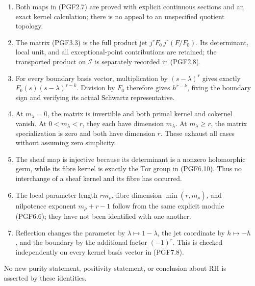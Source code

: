 \begin{enumerate}
\def\labelenumi{\arabic{enumi}.}
\tightlist
\item
  Both maps in (PGF2.7) are proved with explicit continuous sections and
  an exact kernel calculation; there is no appeal to an unspecified
  quotient topology.
\item
  The matrix (PGF3.3) is the full product jet \(j^rF_0\,j^r(F/F_0)\).
  Its determinant, local unit, and all exceptional-point contributions
  are retained; the transported product on \(\mathcal I\) is separately
  recorded in (PGF2.8).
\item
  For every boundary basis vector, multiplication by \((s-\lambda)^r\)
  gives exactly \(F_0(s)(s-\lambda)^{r-k}\). Division by \(F_0\)
  therefore gives \(h^{r-k}\), fixing the boundary sign and verifying
  its actual Schwartz representative.
\item
  At \(m_\lambda=0\), the matrix is invertible and both primal kernel
  and cokernel vanish. At \(0<m_\lambda<r\), they each have dimension
  \(m_\lambda\). At \(m_\lambda\ge r\), the matrix specialization is
  zero and both have dimension \(r\). These exhaust all cases without
  assuming zero simplicity.
\item
  The sheaf map is injective because its determinant is a nonzero
  holomorphic germ, while its fibre kernel is exactly the Tor group in
  (PGF6.10). Thus no interchange of a sheaf kernel and its fibre has
  occurred.
\item
  The local parameter length \(r m_\rho\), fibre dimension
  \(\min(r,m_\rho)\), and nilpotence exponent \(m_\rho+r-1\) follow from
  the same explicit module (PGF6.6); they have not been identified with
  one another.
\item
  Reflection changes the parameter by \(\lambda\mapsto1-\lambda\), the
  jet coordinate by \(h\mapsto-h\), and the boundary by the additional
  factor \((-1)^r\). This is checked independently on every kernel basis
  vector in (PGF7.8).
\end{enumerate}

No new purity statement, positivity statement, or conclusion about RH is
asserted by these identities.
